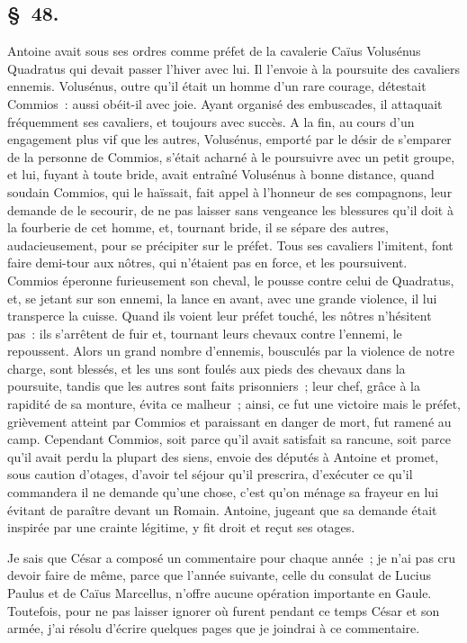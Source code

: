 \documentclass[french,twoside]{book} %
\begin{document}
\subsection[{§ 48.}]{ \textsc{§ 48.} }
\noindent Antoine avait sous ses ordres comme préfet de la cavalerie Caïus Volusénus Quadratus qui devait passer l’hiver avec lui. Il l’envoie à la poursuite des cavaliers ennemis. Volusénus, outre qu’il était un homme d’un rare courage, détestait Commios : aussi obéit-il avec joie. Ayant organisé des embuscades, il attaquait fréquemment ses cavaliers, et toujours avec succès. A la fin, au cours d’un engagement plus vif que les autres, Volusénus, emporté par le désir de s’emparer de la personne de Commios, s’était acharné à le poursuivre avec un petit groupe, et lui, fuyant à toute bride, avait entraîné Volusénus à bonne distance, quand soudain Commios, qui le haïssait, fait appel à l’honneur de ses compagnons, leur demande de le secourir, de ne pas laisser sans vengeance les blessures qu’il doit à la fourberie de cet homme, et, tournant bride, il se sépare des autres, audacieusement, pour se précipiter sur le préfet. Tous ses cavaliers l’imitent, font faire demi-tour aux nôtres, qui n’étaient pas en force, et les poursuivent. Commios éperonne furieusement son cheval, le pousse contre celui de Quadratus, et, se jetant sur son ennemi, la lance en avant, avec une grande violence, il lui transperce la cuisse. Quand ils voient leur préfet touché, les nôtres n’hésitent pas : ils s’arrêtent de fuir et, tournant leurs chevaux contre l’ennemi, le repoussent. Alors un grand nombre d’ennemis, bousculés par la violence de notre charge, sont blessés, et les uns sont foulés aux pieds des chevaux dans la poursuite, tandis que les autres sont faits prisonniers ; leur chef, grâce à la rapidité de sa monture, évita ce malheur ; ainsi, ce fut une victoire mais le préfet, grièvement atteint par Commios et paraissant en danger de mort, fut ramené au camp. Cependant Commios, soit parce qu’il avait satisfait sa rancune, soit parce qu’il avait perdu la plupart des siens, envoie des députés à Antoine et promet, sous caution d’otages, d’avoir tel séjour qu’il prescrira, d’exécuter ce qu’il commandera il ne demande qu’une chose, c’est qu’on ménage sa frayeur en lui évitant de paraître devant un Romain. Antoine, jugeant que sa demande était inspirée par une crainte légitime, y fit droit et reçut ses otages.\par
\par
Je sais que César a composé un commentaire pour chaque année ; je n’ai pas cru devoir faire de même, parce que l’année suivante, celle du consulat de Lucius Paulus et de Caïus Marcellus, n’offre aucune opération importante en Gaule. Toutefois, pour ne pas laisser ignorer où furent pendant ce temps César et son armée, j’ai résolu d’écrire quelques pages que je joindrai à ce commentaire.
\end{document}
